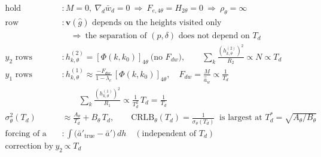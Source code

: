 \documentclass[11pt,a4paper,fontset=none]{ctexart}
\newcommand{\ba}{\bar{a}}
\newcommand{\bw}{\bar{w}}
\newcommand{\ap}{\ba'}
\newcommand{\ah}{\hat{\ba}_w}
\newcommand{\gh}{\hat{g}}
\newcommand{\dl}{\delta}
\newcommand{\Phik}{\Phi(k,k_0)}
\begin{document}
\begin{align*}
\text{hold}          &: M = 0,\ \nabla_d\bw_d = 0 \ \Rightarrow\ F_{e,4\theta} = H_{2\theta} = 0 \ \Rightarrow\ \rho_\theta = \infty \\
\text{row directions} &: \mathbf{v}(\gh) \text{ depends on the heights visited only} \\
                      &\quad \Rightarrow\ \text{the separation of } (p, \dl) \text{ does not depend on } T_d \\[4pt]
y_2 \text{ rows}     &: h^{(2)}_{k,\theta} = [\Phik]_{4\theta} \ \text{(no } F_{dw}\text{)}, \qquad
                        \sum_k \frac{(h^{(2)}_{k,\theta})^{2}}{R_2} \propto N \propto T_d \\
y_1 \text{ rows}     &: h^{(1)}_{k,\theta} \approx \frac{-F_{dw}}{1-\lambda_c}\,[\Phik]_{4\theta}, \quad F_{dw} = \frac{M}{\ah} \propto \frac{1}{T_d} \\
                     &\qquad \sum_k \frac{(h^{(1)}_{k,\theta})^{2}}{R_1} \propto \frac{1}{T_d^{2}}\,T_d = \frac{1}{T_d} \\[4pt]
\sigma_\theta^{2}(T_d) &\approx \frac{A_\theta}{T_d} + B_\theta\,T_d, \qquad
\mathrm{CRLB}_\theta(T_d) = \frac{1}{\sigma_\theta(T_d)} \ \text{ is largest at } T_d^{*} = \sqrt{A_\theta/B_\theta} \\[4pt]
\text{forcing of a wrong slope} &: \int \bigl(\ap_{\mathrm{true}} - \ap\bigr)\,dh \quad(\text{independent of } T_d) \\
\text{correction by } y_2 &\propto T_d
\end{align*}
\end{document}
